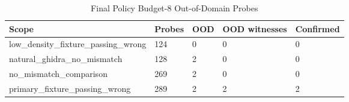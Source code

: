 \begin{table}[t]
\centering
\small
\begin{tabular}{lllll}
\toprule
Scope & Probes & OOD & OOD witnesses & Confirmed \\
\midrule
low\_density\_fixture\_passing\_wrong & 124 & 0 & 0 & 0 \\
natural\_ghidra\_no\_mismatch & 128 & 2 & 0 & 0 \\
no\_mismatch\_comparison & 269 & 2 & 0 & 0 \\
primary\_fixture\_passing\_wrong & 289 & 2 & 2 & 2 \\
\bottomrule
\end{tabular}
\caption{Final Policy Budget-8 Out-of-Domain Probes}
\end{table}
